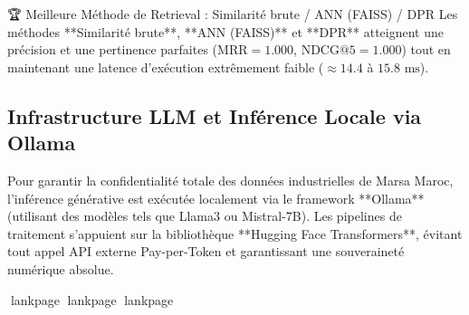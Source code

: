 \documentclass[12pt,a4paper,oneside]{report}
\newcommand{\blankpage}{%
  \newpage
  \thispagestyle{empty}%
  \mbox{}%
  \newpage
}
\begin{document}
\begin{table}[H]
\centering
\small
\caption{Benchmark des 6 méthodes de Retrieval (Données Identiques Plateforme - 6 Colonnes Exactes)}
\label{tab:retrieval_metrics}
\end{table}

\begin{bestbox}{🏆 Meilleure Méthode de Retrieval : Similarité brute / ANN (FAISS) / DPR}
Les méthodes **Similarité brute**, **ANN (FAISS)** et **DPR** atteignent une précision et une pertinence parfaites ($\text{MRR} = 1.000$, $\text{NDCG@5} = 1.000$) tout en maintenant une latence d'exécution extrêmement faible ($\approx 14.4$ à $15.8\text{ ms}$).
\end{bestbox}

\subsection{Infrastructure LLM et Inférence Locale via Ollama}
Pour garantir la confidentialité totale des données industrielles de Marsa Maroc, l'inférence générative est exécutée localement via le framework **Ollama** (utilisant des modèles tels que Llama3 ou Mistral-7B). Les pipelines de traitement s'appuient sur la bibliothèque **Hugging Face Transformers**, évitant tout appel API externe Pay-per-Token et garantissant une souveraineté numérique absolue.

lankpage
lankpage
lankpage
\blankpage
\end{document}
